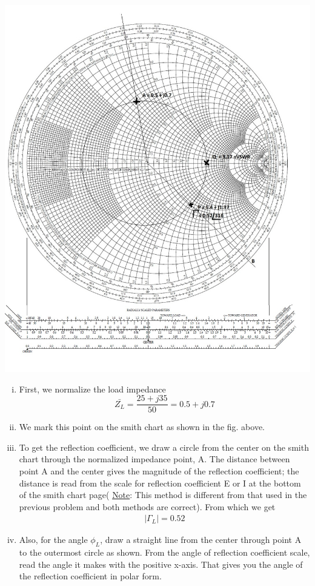 \begin{example}
\begin{center}
\includegraphics[width=1\linewidth]{"./graphics/Smith chart 1"}
\end{center}


\begin{enumerate}[(i)]
\item First, we normalize the load impedance
\begin{dmath*}
\bar{Z_{L}}=\frac{25+j35}{50}=0.5+j0.7
\end{dmath*}
\item We mark this point on the smith chart as shown in the fig. above.
\item To get the reflection coefficient, we draw a circle from the center on the smith chart through the normalized impedance point, A. The distance between point A and the center gives the magnitude of the reflection coefficient; the distance is read from the scale for reflection coefficient E or I at the bottom of the smith chart page( \underline{Note}: This method is different from that used in the previous problem and both methods are correct). From which we get
\begin{align*}
|\Gamma_{L}| = 0.52
\end{align*}
\item Also, for the angle $\phi_{L}$, draw a straight line from the center through point A to the outermost circle as shown. From the angle of reflection coefficient scale, read the angle it makes with the positive x-axis. That gives you the angle of the reflection coefficient in polar form.


\end{enumerate}
\end{example}
